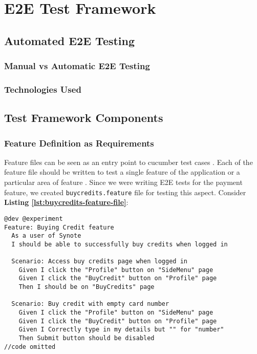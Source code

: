 \chapter{E2E Test Framework}
\label{chap:e2e-test-framework}

\section{Automated E2E Testing}
\label{sec:automated-e2e-testing}

\subsection{Manual vs Automatic E2E Testing}
\label{sec:manual-vs-automatic-e2e-testing}

\subsection{Technologies Used}
\label{sec:technologies-used}

\section{Test Framework Components}
\label{sec:test-framework-components}

\subsection{Feature Definition as Requirements}
\label{subsec:feautre-definition-as-requirements}

Feature files can be seen as an entry point to cucumber test cases \cite{featurefile1}. Each of the feature file should be written to test a single feature of the application or a particular area of feature \cite{featurefile2}. Since we were writing E2E tests for the payment feature, we created \texttt{buycredits.feature} file for testing this aspect. Consider \textbf{Listing \ref{lst:buycredits-feature-file}}:\\

\begin{listing}[H]
\begin{verbatim}
@dev @experiment
Feature: Buying Credit feature
  As a user of Synote
  I should be able to successfully buy credits when logged in

  Scenario: Access buy credits page when logged in
    Given I click the "Profile" button on "SideMenu" page
    Given I click the "BuyCredit" button on "Profile" page
    Then I should be on "BuyCredits" page

  Scenario: Buy credit with empty card number
    Given I click the "Profile" button on "SideMenu" page
    Given I click the "BuyCredit" button on "Profile" page
    Given I Correctly type in my details but "" for "number"
    Then Submit button should be disabled
//code omitted
\end{verbatim}
\label{lst:buycredits-feature-file}
\end{listing}

